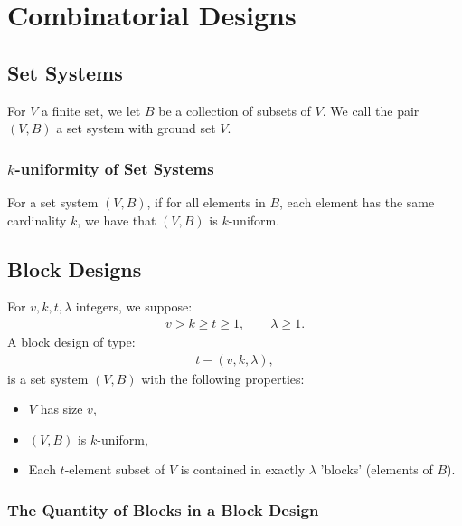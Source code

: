 \section{Combinatorial Designs}

\subsection{Set Systems}

For $V$ a finite set, we let $B$ be a collection of subsets of $V$.
We call the pair $(V, B)$ a set system with ground set $V$.

\subsubsection{$k$-uniformity of Set Systems}

For a set system $(V, B)$, if for all elements in $B$, 
each element has the same cardinality $k$,
we have that $(V, B)$ is $k$-uniform.  
 
\subsection{Block Designs} For $v, k, t, \lambda$ integers,
we suppose: \begin{gather*}
  v > k \geq t \geq 1, \qquad \lambda \geq 1.
\end{gather*} A block design of type: \begin{gather*}
  t-(v, k, \lambda),
\end{gather*} is a set system $(V, B)$ with the following properties:
\begin{itemize}
  \item $V$ has size $v$,
  \item $(V, B)$ is $k$-uniform,
  \item Each $t$-element subset of $V$ is contained in exactly
  $\lambda$ 'blocks' (elements of $B$).
\end{itemize}

\subsubsection{The Quantity of Blocks in a Block Design}

